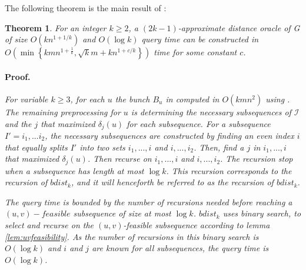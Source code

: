 \documentclass[12pt]{article}
\newtheorem{thm}{Theorem}[section]
\begin{document}
The following theorem is the main result of \cite{Wulff2013}:
\\
\begin{thm}
For an integer $k\geq 2$, a $(2k - 1)$-approximate distance oracle of G of size $O(kn^{1+1/k})$ and $O(\log k)$ query time can be constructed in $O\left( \min \left\lbrace kmn^{1+\frac{1}{k}}, \sqrt{k}m + kn^{1+c/k}\right\rbrace\right)$ time for some constant $c$.

\paragraph{Proof.} 

For variable $k\geq 3$, for each $u$ the bunch $B_u$ in computed in $O(kmn^{2})$ using \cite{Thorup2005}. The remaining preprocessing for $u$ is determining the necessary subsequences of $\mathcal{I}$ and the $j$ that maximized $\delta_j(u)$ for each subsequence.
For a subsequence $I'=i_1,...i_2$, the necessary subsequences are constructed by finding an even index $i$ that equally splits $I'$ into two sets $i_1,...,i$ and $i,...,i_2$. Then, find a $j$ in $i_1,...,i$ that maximized $\delta_j(u)$. Then recurse on $i_1,...,i$ and $i,...,i_2$. The recursion stop when a subsequence has length at most $\log k$. This recursion corresponds to the recursion of $bdist_k$, and it will henceforth be referred to as the recursion of $bdist_k$.

The query time is bounded by the number of recursions needed before reaching a $(u,v)-feasible$ subsequence of size at most $\log k$. $bdist_k$ uses binary search, to select and recurse on the $(u,v)$-feasible subsequence according to lemma \ref{lem:uvfeasibility}. As the number of recursions in this binary search is $O(\log k)$ and $i$ and $j$ are known for all subsequences, the query time is $O(\log k)$.


\end{thm}
\end{document}
